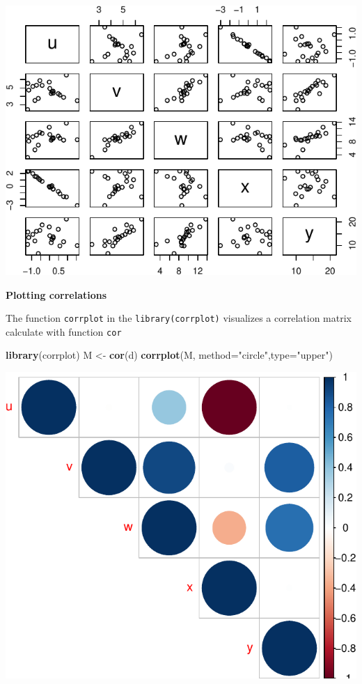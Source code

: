 \documentclass[]{article}
\newenvironment{Shaded}{\begin{snugshade}}{\end{snugshade}}
\newcommand{\KeywordTok}[1]{\textcolor[rgb]{0.13,0.29,0.53}{\textbf{{#1}}}}
\newcommand{\DataTypeTok}[1]{\textcolor[rgb]{0.13,0.29,0.53}{{#1}}}
\newcommand{\StringTok}[1]{\textcolor[rgb]{0.31,0.60,0.02}{{#1}}}
\newcommand{\NormalTok}[1]{{#1}}
\numberwithin{equation}{section}
\begin{document}
\includegraphics{index_files/figure-latex/unnamed-chunk-83-1.pdf}

\textbf{Plotting correlations}

The function \texttt{corrplot} in the \texttt{library(corrplot)}
visualizes a correlation matrix calculate with function \texttt{cor}

\begin{Shaded}
\begin{Highlighting}[]
\KeywordTok{library}\NormalTok{(corrplot)}
\NormalTok{M <-}\StringTok{ }\KeywordTok{cor}\NormalTok{(d)}
\KeywordTok{corrplot}\NormalTok{(M, }\DataTypeTok{method=}\StringTok{"circle"}\NormalTok{,}\DataTypeTok{type=}\StringTok{"upper"}\NormalTok{)}
\end{Highlighting}
\end{Shaded}

\includegraphics{index_files/figure-latex/unnamed-chunk-84-1.pdf}
\end{document}
